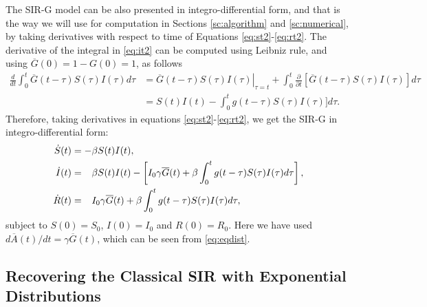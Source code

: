 \documentclass[USenglish,10pt]{article}
\newcommand{\Ab}{\overline{A}\xspace}
\newcommand{\Gb}{\overline{G}\xspace}
\newcommand{\phm}{\ensuremath\phantom{-}\xspace}
\begin{document}
The SIR-G model can be also presented in integro-differential form, and that is the way we will use for computation in Sections \ref{sc:algorithm} and \ref{sc:numerical}, by taking derivatives with respect to time of Equations \eqref{eq:st2}-\eqref{eq:rt2}. The derivative of the integral in \eqref{eq:it2} can be computed using Leibniz rule, and using $\Gb(0)=1-G(0)=1$, as follows
\begin{align*}
	\frac{d}{dt}\int_0^t \Gb(t-\tau) S(\tau)I(\tau)d\tau
	&= \left. \Gb(t-\tau) S(\tau)I(\tau) \right|_{\tau=t}
	 + \int_0^t \frac{\partial}{\partial t} [\Gb(t-\tau) S(\tau)I(\tau)]d\tau \\
	&= S(t)I(t) -  \int_0^t g(t-\tau) S(\tau)I(\tau)]d\tau.
\end{align*}
Therefore, taking derivatives in equations \eqref{eq:st2}-\eqref{eq:rt2}, we get the SIR-G in integro-differential form:
\begin{subequations}
	\begin{align}
		\dot S(t) &= -\beta S(t)I(t),
		\label{eq:Sdot2} \\
		\dot I(t) &= \phm  \beta  S(t)I(t) - \left[ I_0 \gamma \Gb(t) +  \beta\int_0^t g(t-\tau) S(\tau)I(\tau)d\tau \right],
		\label{eq:Idot2} \\
		\dot R(t) &= \phm I_0 \gamma \Gb(t) + \beta\int_0^t g(t-\tau) S(\tau)I(\tau)d\tau,
		\label{eq:Rdot2}
	\end{align}
\end{subequations}
subject to $S(0)=S_0$, $I(0)=I_0$ and $R(0)=R_0$.
Here we have used $d\Ab(t)/dt=\gamma\Gb(t)$, which  can be seen from \eqref{eq:eqdist}.


\subsection{Recovering the Classical SIR with Exponential Distributions}
\end{document}
